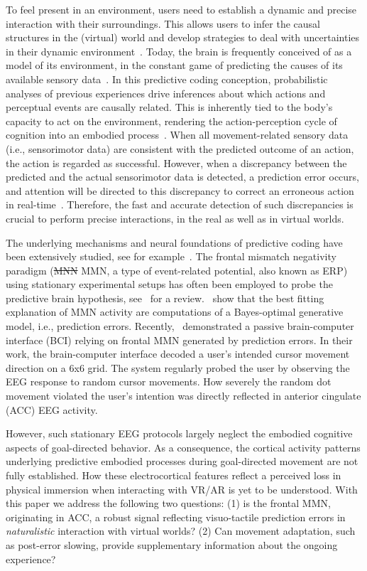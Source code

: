To feel present in an environment, users need to establish a dynamic and precise interaction with their surroundings. This allows users to infer the causal structures in the (virtual) world and develop strategies to deal with uncertainties in their dynamic environment~\cite{Knill2004-sz}. Today, the brain is frequently conceived of as a model of its environment, in the constant game of predicting the causes of its available sensory data~\cite{Clark2013-ah, Friston2010-hy, Rao1999-zr}. In this predictive coding conception, probabilistic analyses of previous experiences drive inferences about which actions and perceptual events are causally related. This is inherently tied to the body’s capacity to act on the environment, rendering the action-perception cycle of cognition into an embodied process~\cite{Friston2012-gq}. When all movement-related sensory data (i.e., sensorimotor data) are consistent with the predicted outcome of an action, the action is regarded as successful. However, when a discrepancy between the predicted and the actual sensorimotor data is detected, a prediction error occurs, and attention will be directed to this discrepancy to correct an erroneous action in real-time~\cite{Savoie2018-ad}. Therefore, the fast and accurate detection of such discrepancies is crucial to perform precise interactions, in the real as well as in virtual worlds.

The underlying mechanisms and neural foundations of predictive coding have been extensively studied, see for example~\cite{Holroyd2002-in, Clark2013-ah, Bendixen2012-jx}. The frontal mismatch negativity paradigm (\st{MNN} \textcolor{n}{MMN}, a type of event-related potential, also known as ERP) using stationary experimental setups has often been employed to probe the predictive brain hypothesis, see~\cite{Stefanics2014-vk} for a review.~\cite{Lieder2013-dl} show that the best fitting explanation of MMN activity are computations of a Bayes-optimal generative model, i.e., prediction errors. Recently,~\cite{Zander2016-ed} demonstrated a passive brain-computer interface \textcolor{n}{(BCI)} relying on frontal MMN generated by prediction errors. In their work, the brain-computer interface decoded a user's intended cursor movement direction on a 6x6 grid. The system regularly probed the user by observing the EEG response to random cursor movements. How severely the random dot movement violated the user's intention was directly reflected in anterior cingulate (ACC) EEG activity. 

However, such stationary EEG protocols largely neglect the embodied cognitive aspects of goal-directed behavior. As a consequence, the cortical activity patterns underlying predictive embodied processes during goal-directed movement are not fully established. How these electrocortical features reflect a perceived loss in physical immersion when interacting with VR/AR is yet to be understood. With this paper we address the following two questions: (1) is the frontal MMN, originating in ACC, a robust signal reflecting visuo-tactile prediction errors in \textit{naturalistic} interaction with virtual worlds? (2) Can movement adaptation, such as post-error slowing, provide supplementary information about the ongoing experience?


